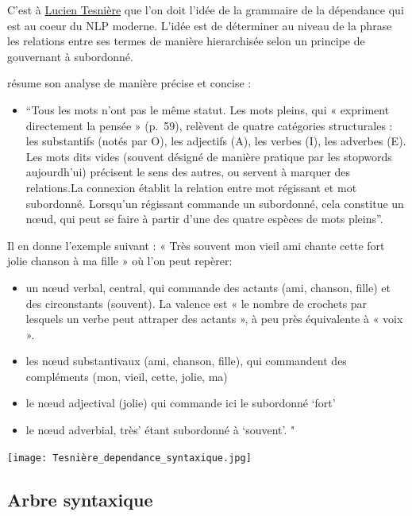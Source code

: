 \documentclass[
]{book}
\providecommand{\tightlist}{%
  \setlength{\itemsep}{0pt}\setlength{\parskip}{0pt}}
\begin{document}
C'est à \href{https://www.ac-sciences-lettres-montpellier.fr/academie_edition/fichiers_conf/VERDELHAN-BOURGADE-2020.pdf}{Lucien Tesnière} que l'on doit l'idée de la grammaire de la dépendance qui est au coeur du NLP moderne. L'idée est de déterminer au niveau de la phrase les relations entre ses termes de manière hierarchisée selon un principe de gouvernant à subordonné.

\citet{verdelhan-bourgade_lucien_2020} résume son analyse de manière précise et concise :

\begin{itemize}
\tightlist
\item
  ``Tous les mots n'ont pas le même statut. Les mots pleins, qui « expriment directement la pensée » (p.~59), relèvent de quatre catégories structurales : les substantifs (notés par O), les adjectifs (A), les verbes (I), les adverbes (E). Les mots dits vides (souvent désigné de manière pratique par les stopwords aujourdh'ui) précisent le sens des autres, ou servent à marquer des relations.La connexion établit la relation entre mot régissant et mot subordonné. Lorsqu'un régissant commande un subordonné, cela constitue un nœud, qui peut se faire à partir d'une des quatre espèces de mots pleins''.
\end{itemize}

Il en donne l'exemple suivant : « Très souvent mon vieil ami chante cette fort jolie chanson à ma fille » où l'on peut repèrer:

\begin{itemize}
\tightlist
\item
  un nœud verbal, central, qui commande des actants (ami, chanson, fille) et des circonstants (souvent). La valence est « le nombre de crochets par lesquels un verbe peut attraper des actants », à peu près équivalente à « voix ».
\item
  les nœud substantivaux (ami, chanson, fille), qui commandent des compléments (mon, vieil, cette, jolie, ma)
\item
  le nœud adjectival (jolie) qui commande ici le subordonné `fort'
\item
  le nœud adverbial, très' étant subordonné à `souvent'. "
\end{itemize}

\texttt{[image: Tesnière\_dependance\_syntaxique.jpg]}

\hypertarget{arbre-syntaxique}{%
\subsection{Arbre syntaxique}\label{arbre-syntaxique}}
\end{document}

